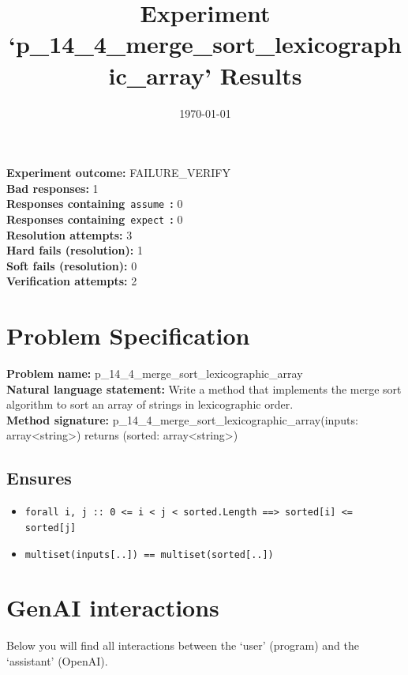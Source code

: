 \documentclass{article}
\begin{document}
\title{Experiment `p\_14\_4\_merge\_sort\_lexicographic\_array' Results}
\author{\today}
\date{}
\maketitle
\textbf{Experiment outcome: }FAILURE\_VERIFY
\\\textbf{Bad responses: }1
\\\textbf{Responses containing}~\texttt{assume}~\textbf{: }0
\\\textbf{Responses containing}~\texttt{expect}~\textbf{: }0
\\\textbf{Resolution attempts: }3
\\\textbf{Hard fails (resolution): }1
\\\textbf{Soft fails (resolution): }0
\\\textbf{Verification attempts: }2
\section*{Problem Specification}
\textbf{Problem name: }p\_14\_4\_merge\_sort\_lexicographic\_array
\\\textbf{Natural language statement: }Write a method that implements the merge sort algorithm to sort an array of strings in lexicographic order.
\\\textbf{Method signature: }p\_14\_4\_merge\_sort\_lexicographic\_array(inputs: array<string>) returns (sorted: array<string>)
\subsection*{Ensures}
\begin{itemize}
\item \texttt{forall i, j :: 0 <= i < j < sorted.Length ==> sorted[i] <= sorted[j]}
\item \texttt{multiset(inputs[..]) == multiset(sorted[..])}
\end{itemize}
\clearpage
\section*{GenAI interactions}
Below you will find all interactions between the `user' (program) and the `assistant' (OpenAI).
\end{document}
